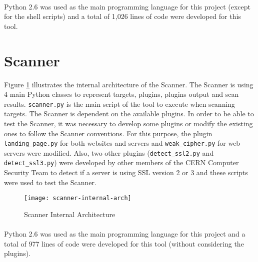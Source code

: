 \paragraph{}
Python 2.6 was used as the main programming language for this project (except for the shell scripts) and a total of 1,026 lines of code were developed for this tool. 
\section{Scanner}
Figure \ref{figure:scanner-internal-arch} illustrates the internal architecture of the Scanner. The Scanner is using 4 main Python classes to represent targets, plugins, plugins output and scan results. \texttt{scanner.py} is the main script of the tool to execute when scanning targets. The Scanner is dependent on the available plugins. In order to be able to test the Scanner, it was necessary to develop some plugins or modify the existing ones to follow the Scanner conventions. For this purpose, the plugin \texttt{landing\_page.py} for both websites and servers and \texttt{weak\_cipher.py} for web servers were modified. Also, two other plugins (\texttt{detect\_ssl2.py} and \texttt{detect\_ssl3.py}) were developed by other members of the CERN Computer Security Team to detect if a server is using SSL version 2 or 3 and these scripts were used to test the Scanner.
\begin{figure}[h!]
  \centering
    \texttt{[image: scanner-internal-arch]}
  \caption{Scanner Internal Architecture}
   \label{figure:scanner-internal-arch}
\end{figure}
\paragraph{}
Python 2.6 was used as the main programming language for this project and a total of 977 lines of code were developed for this tool (without considering the plugins). 